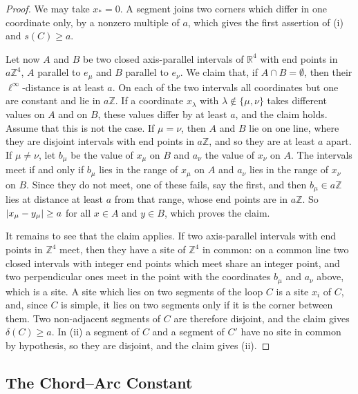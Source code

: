 \documentclass[11pt]{preprint}
\DeclarePairedDelimiter{\abs}{\lvert}{\rvert}
\numberwithin{equation}{section}
\theoremstyle{definition}
\theoremstyle{remark}
\theoremstyle{plain}
\begin{document}
\begin{proof}
We may take $x_* = 0$. A segment joins two corners which differ in one coordinate only, by a nonzero multiple of $a$, which gives the first assertion of (i) and $s(C) \geq a$.

Let now $A$ and $B$ be two closed axis-parallel intervals of $\mathbb R^4$ with end points in $a\mathbb Z^4$, $A$ parallel to $e_\mu$ and $B$ parallel to $e_\nu$. We claim that, if $A \cap B = \emptyset$, then their $\ell^\infty$-distance is at least $a$. On each of the two intervals all coordinates but one are constant and lie in $a\mathbb Z$. If a coordinate $x_\lambda$ with $\lambda \notin \{ \mu, \nu \}$ takes different values on $A$ and on $B$, these values differ by at least $a$, and the claim holds. Assume that this is not the case. If $\mu = \nu$, then $A$ and $B$ lie on one line, where they are disjoint intervals with end points in $a\mathbb Z$, and so they are at least $a$ apart. If $\mu \neq \nu$, let $b_\mu$ be the value of $x_\mu$ on $B$ and $a_\nu$ the value of $x_\nu$ on $A$. The intervals meet if and only if $b_\mu$ lies in the range of $x_\mu$ on $A$ and $a_\nu$ lies in the range of $x_\nu$ on $B$. Since they do not meet, one of these fails, say the first, and then $b_\mu \in a\mathbb Z$ lies at distance at least $a$ from that range, whose end points are in $a\mathbb Z$. So $\abs{x_\mu - y_\mu} \geq a$ for all $x \in A$ and $y \in B$, which proves the claim.

It remains to see that the claim applies. If two axis-parallel intervals with end points in $\mathbb Z^4$ meet, then they have a site of $\mathbb Z^4$ in common: on a common line two closed intervals with integer end points which meet share an integer point, and two perpendicular ones meet in the point with the coordinates $b_\mu$ and $a_\nu$ above, which is a site. A site which lies on two segments of the loop $C$ is a site $x_i$ of $C$, and, since $C$ is simple, it lies on two segments only if it is the corner between them. Two non-adjacent segments of $C$ are therefore disjoint, and the claim gives $\delta(C) \geq a$. In (ii) a segment of $C$ and a segment of $C'$ have no site in common by hypothesis, so they are disjoint, and the claim gives (ii).
\end{proof}

\subsection{The Chord--Arc Constant}\label{sec:chord-arc}
\end{document}
